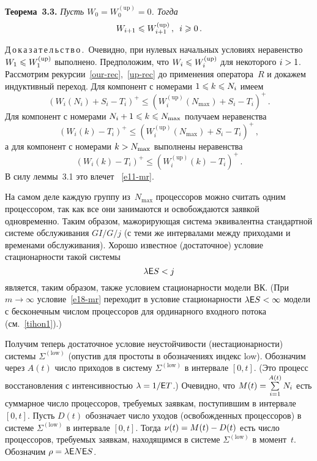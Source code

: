 \begin{multicols}{2}
\textbf{Теорема~3.3.} 
\textit{Пусть $W_{0}=W^{(\mathrm{up})}_{0}=0$. Тогда}
\begin{equation}
W_{i+1}\leqslant W^{(\mathrm{up})}_{i+1}\,,\enskip i\geqslant 0\,.
\label{e11-mr}
\end{equation}


\noindent
Д\,о\,к\,а\,з\,а\,т\,е\,л\,ь\,с\,т\,в\,о\,.\
Очевидно, при нулевых начальных условиях неравенство $W_{1}\hm\leqslant
W^{(\mathrm{up})}_{1}$ выполнено. Предположим, что $W_{i}\hm\leqslant
W^{(\mathrm{up})}_{i}$ для некоторого $i\hm>1$.  Рассмотрим
рекурсии~\eqref{our-rec},~\eqref{up-rec} до применения оператора~$R$
и докажем индуктивный переход. Для компонент с номерами $1\hm\leqslant
k\hm\leqslant N_{i}$ имеем
\begin{equation*}
(W_{i}(N_{i})+S_{i}-T_{i})^{+}\leqslant (W^{(\mathrm{up})}_{i}(N_{\max})+S_{i}-T_{i})^{+}\,.
\end{equation*}
Для компонент с номерами $N_{i}+1\hm\leqslant k\hm\leqslant N_{\max}$
получаем неравенства
\begin{equation*}
(W_{i}(k)-T_{i})^{+}\leqslant
(W^{(\mathrm{up})}_{i}(N_{\max})+S_{i}-T_{i})^{+}\,,
\end{equation*}
а для компонент с номерами $k\hm> N_{\max}$ выполнены неравенства
\begin{equation*}
(W_{i}(k)-T_{i})^{+}\leqslant (W^{(\mathrm{up})}_{i}(k)-T_{i})^{+}\,.
\end{equation*}
В силу леммы~3.1 это влечет ~\eqref{e11-mr}.

\medskip

На самом деле каждую группу из~$N_{\max}$ процессоров можно считать
одним процессором, так как все они занимаются и освобождаются  заявкой
одновременно. Таким образом,  мажорирующая система эквивалентна
стандартной системе обслуживания $GI/G/j$ (с теми же интервалами
между приходами и  временами обслуживания). Хорошо известное
(достаточное) условие стационарности такой сис\-темы
\begin{equation}
\lambda {\sf E} S<j 
\label{e18-mr}
\end{equation}
является, таким образом, также  условием стационарности модели ВК.
(При $m\to\infty$ условие~\eqref{e18-mr} переходит в условие
стационарности $\lambda \e S\hm<\infty$ модели с бесконечным числом
процессоров для ординарного входного потока (см.\ \eqref{tihon1}).)

Получим теперь  достаточное условие неустойчивости (нестационарности)
 сис\-те\-мы $\Sigma^{(\mathrm{low})}$ (опус\-тив для простоты в обозначениях  индекс low).
 Обозначим через $A(t)$ число приходов в
систему $\Sigma^{(\mathrm{low})}$ в интервале $[0,t]$. (Это процесс
восстановления с интенсивностью $\lambda\hm=1/\e T$.) Очевидно, что
$M(t)\hm=\sum\limits_{i=1}^{A(t)}N_{i}$ есть суммарное число процессоров,
требуемых заявкам, поступившим  в интервале $[0,t]$. Пусть $D(t)$
обозначает число уходов (освобожденных процессоров) в сис\-те\-ме
$\Sigma^{(\mathrm{low})}$ в интервале $[0,t]$. Тогда $\nu(t)\hm=M(t)\hm-D(t)$  есть
чис\-ло процессоров, требуемых заявкам, находящимся в сис\-те\-ме
$\Sigma^{(\mathrm{low})}$ в момент~$t$. Обозначим $\rho\hm=\lambda \e N\e S$.


\end{multicols}
